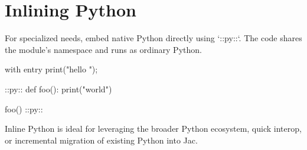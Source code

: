 \section{Inlining Python}

For specialized needs, embed native Python directly using `::py::`. The code shares the module's namespace and runs as ordinary Python.

\begin{jacblock}
with entry {
    print("hello ");
}

::py::
def foo():
    print("world")

foo()
::py::
\end{jacblock}

Inline Python is ideal for leveraging the broader Python ecosystem, quick interop, or incremental migration of existing Python into Jac.